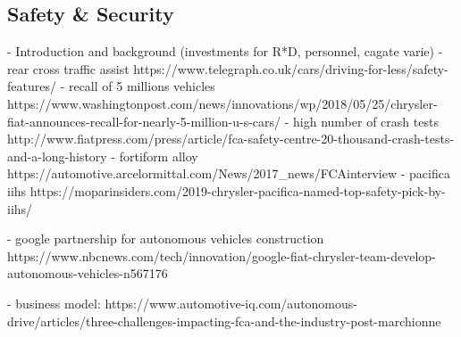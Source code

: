 \subsection{Safety & Security}
- Introduction and background (investments for R*D, personnel, cagate varie)
- rear cross traffic assist https://www.telegraph.co.uk/cars/driving-for-less/safety-features/
- recall of 5 millions vehicles https://www.washingtonpost.com/news/innovations/wp/2018/05/25/chrysler-fiat-announces-recall-for-nearly-5-million-u-s-cars/
- high number of crash tests http://www.fiatpress.com/press/article/fca-safety-centre-20-thousand-crash-tests-and-a-long-history
- fortiform alloy https://automotive.arcelormittal.com/News/2017_news/FCAinterview
- pacifica iihs https://moparinsiders.com/2019-chrysler-pacifica-named-top-safety-pick-by-iihs/


- google partnership for autonomous vehicles construction https://www.nbcnews.com/tech/innovation/google-fiat-chrysler-team-develop-autonomous-vehicles-n567176

- business model: https://www.automotive-iq.com/autonomous-drive/articles/three-challenges-impacting-fca-and-the-industry-post-marchionne